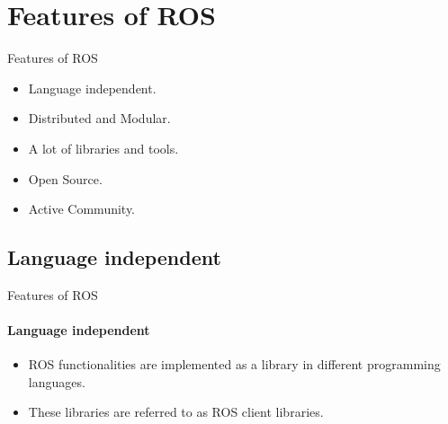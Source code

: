 \documentclass{beamer}
\begin{document}

\section{Features of ROS}

\begin{frame}{Features of ROS}

\begin{itemize}
        \item Language independent.
        \item Distributed and Modular.
        \item A lot of libraries and tools.
        \item Open Source.
        \item Active Community.
\end{itemize}
\end{frame}

\subsection{Language independent}
\begin{frame}{Features of ROS}
\framesubtitle{Language independent}    
\begin{itemize}
    \item ROS functionalities are implemented as a library in different programming languages.
    \item  These libraries are referred to as ROS client libraries.
\end{itemize}
\end{frame}
\end{document}
